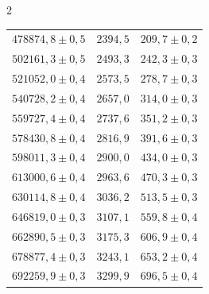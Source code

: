 \documentclass[12pt,twosides,onecolumn,openany]{article}
\newenvironment{Figura}
  {\par\medskip\noindent\minipage{\linewidth}}
  {\endminipage\par\medskip}
\begin{document}
\begin{multicols}{2}
\begin{Figura}
{\begin{tabular}{c|c|c}
      $478874,8 \pm 0,5$ & $2394,5$ & $209,7 \pm 0,2$ \\ 
      $502161,3 \pm 0,5$ & $2493,3$ & $242,3 \pm 0,3$ \\ 
      $521052,0 \pm 0,4$ & $2573,5$ & $278,7 \pm 0,3$ \\ 
      $540728,2 \pm 0,4$ & $2657,0$ & $314,0 \pm 0,3$ \\ 
      $559727,4 \pm 0,4$ & $2737,6$ & $351,2 \pm 0,3$ \\ 
      $578430,8 \pm 0,4$ & $2816,9$ & $391,6 \pm 0,3$ \\ 
      $598011,3 \pm 0,4$ & $2900,0$ & $434,0 \pm 0,3$ \\ 
      $613000,6 \pm 0,4$ & $2963,6$ & $470,3 \pm 0,3$ \\ 
      $630114,8 \pm 0,4$ & $3036,2$ & $513,5 \pm 0,3$ \\ 
      $646819,0 \pm 0,3$ & $3107,1$ & $559,8 \pm 0,4$ \\ 
      $662890,5 \pm 0,3$ & $3175,3$ & $606,9 \pm 0,4$ \\ 
      $678877,4 \pm 0,3$ & $3243,1$ & $653,2 \pm 0,4$ \\ 
      $692259,9 \pm 0,3$ & $3299,9$ & $696,5 \pm 0,4$ \\ 
    \end{tabular}
    }
  \label{tau:AC_calculades}
\end{Figura}
\renewcommand{\arraystretch}{1.48}
\begin{Figura}
  \centering
\end{Figura}
\end{multicols}
\end{document}
